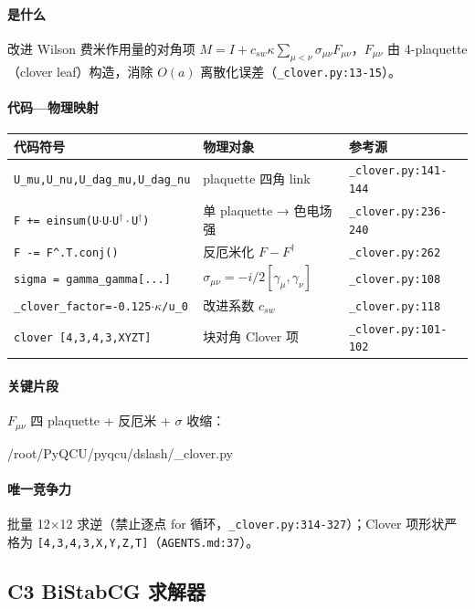 \documentclass[UTF8]{ctexart}
\begin{document}
\paragraph{是什么} 改进 Wilson 费米作用量的对角项 $M = I + c_{sw}\kappa\sum_{\mu<\nu}\sigma_{\mu\nu}F_{\mu\nu}$，$F_{\mu\nu}$ 由 4-plaquette（clover leaf）构造，消除 $O(a)$ 离散化误差（\texttt{\_clover.py:13-15}）。
\paragraph{代码—物理映射}
\begin{xltabular}{\textwidth}{llX}
\toprule
\textcolor{relation}{代码符号} & 物理对象 & 参考源 \\
\midrule
\endhead
\texttt{U\_mu,U\_nu,U\_dag\_mu,U\_dag\_nu} & plaquette 四角 link & \texttt{\_clover.py:141-144} \\
\texttt{F += einsum(U$\cdot$U$\cdot$U$^\dag\cdot$U$^\dag$)} & 单 plaquette → 色电场强 & \texttt{\_clover.py:236-240} \\
\texttt{F -= F\^{}.T.conj()} & 反厄米化 $F-F^\dag$ & \texttt{\_clover.py:262} \\
\texttt{sigma = gamma\_gamma[...]} & $\sigma_{\mu\nu}=-i/2[\gamma_\mu,\gamma_\nu]$ & \texttt{\_clover.py:108} \\
\texttt{\_clover\_factor=-0.125$\cdot\kappa$/u\_0} & 改进系数 $c_{sw}$ & \texttt{\_clover.py:118} \\
\texttt{clover [4,3,4,3,XYZT]} & 块对角 Clover 项 & \texttt{\_clover.py:101-102} \\
\bottomrule
\end{xltabular}
\paragraph{关键片段} $F_{\mu\nu}$ 四 plaquette + 反厄米 + $\sigma$ 收缩：
\begin{lstinputlisting}[firstline=234,lastline=267,language=python]{/root/PyQCU/pyqcu/dslash/_clover.py}
\end{lstinputlisting}
\paragraph{唯一竞争力} 批量 12×12 求逆（禁止逐点 for 循环，\texttt{\_clover.py:314-327}）；Clover 项形状严格为 \texttt{[4,3,4,3,X,Y,Z,T]}（\texttt{AGENTS.md:37}）。

\subsection{C3 BiStabCG 求解器}
\end{document}
